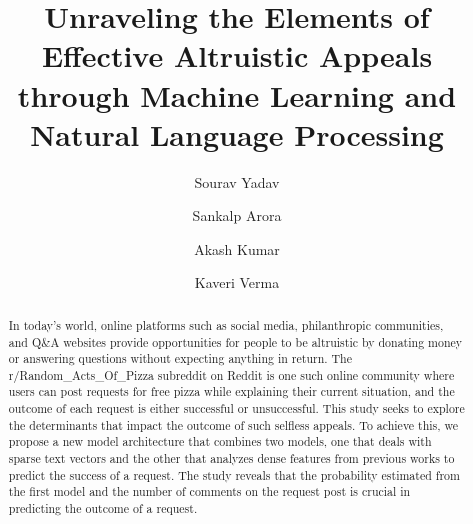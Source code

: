 \documentclass[runningheads]{llncs}
\begin{document}
\title{Unraveling the Elements of Effective Altruistic Appeals through Machine 
Learning and Natural Language Processing\\
}

\author{Sourav Yadav\and
Sankalp Arora\and
Akash Kumar\and
Kaveri Verma}


\maketitle

\begin{abstract}
In today's world, online platforms such as social media, philanthropic communities, and Q\&A websites provide opportunities for people to be altruistic by donating money or answering questions without expecting anything in return. The r/Random\_Acts\_Of\_Pizza subreddit on Reddit is one such online community where users can post requests for free pizza while explaining their current situation, and the outcome of each request is either successful or unsuccessful. This study seeks to explore the determinants that impact the outcome of such selfless appeals. To achieve this, we propose a new model architecture that combines two models, one that deals with sparse text vectors and the other that analyzes dense features from previous works to predict the success of a request. The study reveals that the probability estimated from the first model and the number of comments on the request post is crucial in predicting the outcome of a request.
\end{abstract}

\end{document}
